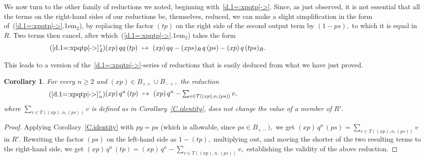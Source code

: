 \documentclass{amsart}
\newtheorem{corollary}[theorem]{Corollary}
\begin{document}
We now turn to the other family of reductions we
noted, beginning with~\eqref{d.1=:xpqtp|->}.
Since, as just observed, it is not essential that all
the terms on the right-hand sides of our reductions
be, themselves, reduced, we can make a slight
simplification in the form of~({{\setlength{\mathsurround}{0em}\ref{d.1=:xpqtp|->}\kern.1em$_{{2}}$}}),
by replacing the factor $(tp)$ on the right side of the
second output term by $(1-ps),$ to which it is equal in $R.$
Two terms then cancel, after which~({{\setlength{\mathsurround}{0em}\ref{d.1=:xpqtp|->}\kern.1em$_{{2}}$}}) takes the form
\begin{equation}\tag{{{\setlength{\mathsurround}{0em}\ref{d.1=:xpqtp|->}\kern.1em$'_{{2}}$}}}\begin{minipage}[c]{35pc}
$(xp)\,qq\,(tp)\ \mapsto\ (xp)\,qq - (xps)_R\,q\,(ps)
- (xp)\,q\,(tps)_R.$
\end{minipage}\end{equation}

This leads to a version of the~\eqref{d.1=:xpqtp|->}-series
of reductions that is easily deduced from what we have just proved.

\begin{corollary}\label{C.identity_tp}
For every $n\geq 2$ and $(xp)\in B_{++}\cup B_{-+},$ the reduction
\begin{equation}\tag{{{\setlength{\mathsurround}{0em}\ref{d.1=:xpqtp|->}\kern.1em$'_{{n}}$}}}\begin{minipage}[c]{35pc}
$(xp)\,q^n\,(tp)\ \mapsto\ (xp)\,q^n - \sum_{v\in T((xp),n,(ps))} v,$
\end{minipage}\end{equation}
where $\sum_{v\in T((xp),n,(ps))} v$ is defined
as in Corollary~\ref{C.identity},
does not change the value of a member of $R'.$
\end{corollary}

\begin{proof}
Applying Corollary~\ref{C.identity} with $py=ps$
(which is allowable, since $ps\in B_{+-}),$ we get
$(xp)\,q^n\,(ps)=\sum_{v\in T((xp),n,(ps))} v$ in $R'.$
Rewriting the factor $(ps)$ on the left-hand
side as $1-(tp),$ multiplying out, and moving the shorter of the
two resulting terms to the right-hand side, we get
$(xp)\,q^n\,(tp)=(xp)\,q^n - \sum_{v\in T((xp),n,(ps))} v,$
establishing the validity of the above reduction.
\end{proof}
\end{document}
